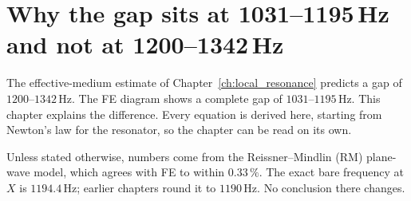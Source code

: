 
\chapter{Why the gap sits at 1031--1195\,Hz and not at 1200--1342\,Hz}
\label{ch:gap_position}

The effective-medium estimate of Chapter~\ref{ch:local_resonance} predicts a
gap of $1200$--$1342\,\mathrm{Hz}$. The FE diagram shows a complete gap of
$1031$--$1195\,\mathrm{Hz}$. This chapter explains the difference. Every
equation is derived here, starting from Newton's law for the resonator, so the
chapter can be read on its own.

Unless stated otherwise, numbers come from the Reissner--Mindlin (RM)
plane-wave model, which agrees with FE to within $0.33\,\%$. The exact bare
frequency at $X$ is $1194.4\,\mathrm{Hz}$; earlier chapters round it to
$1190\,\mathrm{Hz}$. No conclusion there changes.

